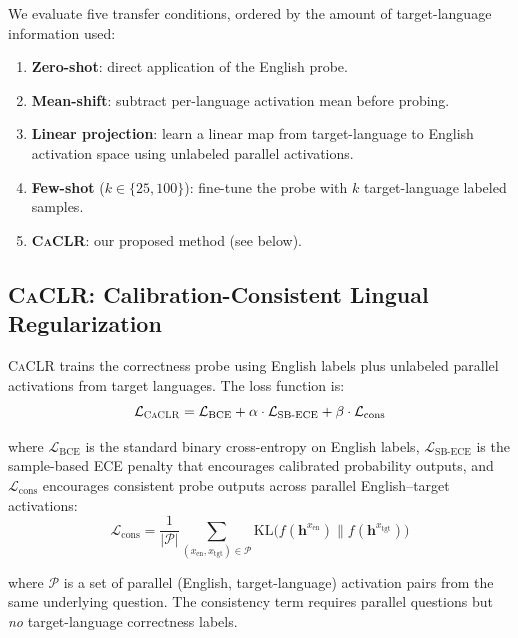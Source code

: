 \documentclass[11pt,a4paper]{article}
\newcommand{\caclr}{\textsc{CaCLR}}
\newcommand{\sbece}{SB-ECE}
\begin{document}
We evaluate five transfer conditions, ordered by the amount of target-language information used:

\begin{enumerate}[nosep,leftmargin=*]
\item \textbf{Zero-shot}: direct application of the English probe.
\item \textbf{Mean-shift}: subtract per-language activation mean before probing.
\item \textbf{Linear projection}: learn a linear map from target-language to English activation space using unlabeled parallel activations.
\item \textbf{Few-shot} ($k \in \{25, 100\}$): fine-tune the probe with $k$ target-language labeled samples.
\item \textbf{\caclr{}}: our proposed method (see below).
\end{enumerate}

\subsection{\caclr{}: Calibration-Consistent Lingual Regularization}
\label{sec:caclr_method}

\caclr{} trains the correctness probe using English labels plus unlabeled parallel activations from target languages.
The loss function is:
\begin{equation}
\mathcal{L}_{\text{\caclr{}}} = \mathcal{L}_{\text{BCE}} + \alpha \cdot \mathcal{L}_{\text{\sbece{}}} + \beta \cdot \mathcal{L}_{\text{cons}}
\label{eq:caclr}
\end{equation}

\noindent where $\mathcal{L}_{\text{BCE}}$ is the standard binary cross-entropy on English labels, $\mathcal{L}_{\text{\sbece{}}}$ is the sample-based ECE penalty that encourages calibrated probability outputs, and $\mathcal{L}_{\text{cons}}$ encourages consistent probe outputs across parallel English--target activations:
\begin{equation}
\mathcal{L}_{\text{cons}} = \frac{1}{|\mathcal{P}|}\sum_{(x_{\text{en}}, x_{\text{tgt}}) \in \mathcal{P}} \text{KL}\big(f(\mathbf{h}^{x_{\text{en}}}) \| f(\mathbf{h}^{x_{\text{tgt}}})\big)
\end{equation}

\noindent where $\mathcal{P}$ is a set of parallel (English, target-language) activation pairs from the same underlying question.
The consistency term requires parallel questions but \emph{no} target-language correctness labels.
\end{document}
